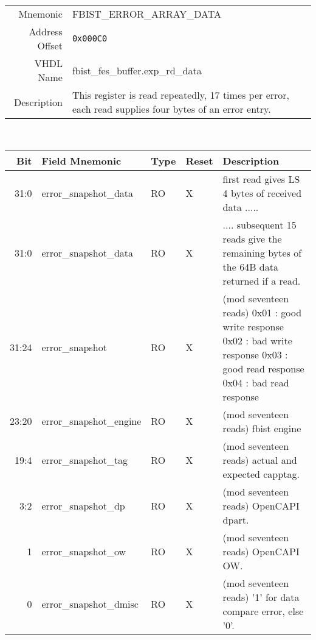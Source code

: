 \begin{tabular}{ r | p{350px} }
  Mnemonic       & FBIST\_ERROR\_ARRAY\_DATA      \\
  Address Offset & \texttt{0x000C0}               \\
  VHDL Name      & fbist\_fes\_buffer.exp\_rd\_data \\ \hline

  Description &
  This register is read repeatedly, 17 times per error, each read supplies
  four bytes of an error entry. \\
\end{tabular}
\\
\begin{tabularx}{\textwidth}{r|l|l|l|X}
  \hline
  Bit   & Field Mnemonic & Type & Reset & Description \\ \hline

  31:0  & error\_snapshot\_data       & RO   & X     &  first read gives LS 4 bytes \newline
  of received data ..... \\
  31:0  & error\_snapshot\_data    & RO   & X     & ....  subsequent 15 reads give the remaining
  bytes of the 64B data returned if a read.\\
  31:24  & error\_snapshot       & RO   & X     &  (mod seventeen reads)  \newline
  \setlength\parindent{24pt}
  \indent 0x01 : good write response \newline
  \indent 0x02 : bad  write response \newline
  \indent 0x03 : good read response \newline
  \indent 0x04 : bad  read response \\
  23:20  & error\_snapshot\_engine & RO   & X  &  (mod seventeen reads)  \newline
  fbist engine \\
  19:4   & error\_snapshot\_tag & RO   & X     &  (mod seventeen reads)  \newline
  actual and expected capptag. \\
  3:2   & error\_snapshot\_dp & RO   & X     &  (mod seventeen reads)  \newline
  OpenCAPI dpart. \\
  1    & error\_snapshot\_ow & RO   & X     &  (mod seventeen reads)  \newline
  OpenCAPI OW. \\
  0   & error\_snapshot\_dmisc & RO   & X     &  (mod seventeen reads) \newline
  '1' for data compare error, else '0'. \\
\end{tabularx}

